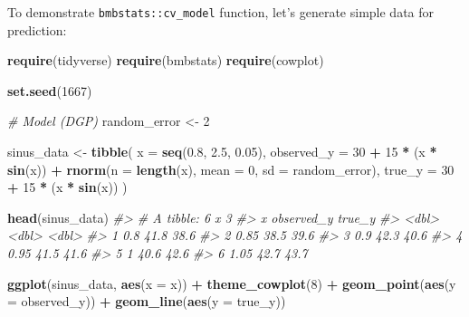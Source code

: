 \documentclass[
]{book}
\newenvironment{Shaded}{\begin{snugshade}}{\end{snugshade}}
\newcommand{\CommentTok}[1]{\textcolor[rgb]{0.56,0.35,0.01}{\textit{#1}}}
\newcommand{\DataTypeTok}[1]{\textcolor[rgb]{0.13,0.29,0.53}{#1}}
\newcommand{\DecValTok}[1]{\textcolor[rgb]{0.00,0.00,0.81}{#1}}
\newcommand{\FloatTok}[1]{\textcolor[rgb]{0.00,0.00,0.81}{#1}}
\newcommand{\KeywordTok}[1]{\textcolor[rgb]{0.13,0.29,0.53}{\textbf{#1}}}
\newcommand{\NormalTok}[1]{#1}
\newcommand{\OperatorTok}[1]{\textcolor[rgb]{0.81,0.36,0.00}{\textbf{#1}}}
\newcommand{\StringTok}[1]{\textcolor[rgb]{0.31,0.60,0.02}{#1}}
\begin{document}
To demonstrate \texttt{bmbstats::cv\_model} function, let's generate simple data for prediction:

\begin{Shaded}
\begin{Highlighting}[]
\KeywordTok{require}\NormalTok{(tidyverse)}
\KeywordTok{require}\NormalTok{(bmbstats)}
\KeywordTok{require}\NormalTok{(cowplot)}

\KeywordTok{set.seed}\NormalTok{(}\DecValTok{1667}\NormalTok{)}

\CommentTok{\# Model (DGP)}
\NormalTok{random\_error <{-}}\StringTok{ }\DecValTok{2}

\NormalTok{sinus\_data <{-}}\StringTok{ }\KeywordTok{tibble}\NormalTok{(}
  \DataTypeTok{x =} \KeywordTok{seq}\NormalTok{(}\FloatTok{0.8}\NormalTok{, }\FloatTok{2.5}\NormalTok{, }\FloatTok{0.05}\NormalTok{),}
  \DataTypeTok{observed\_y =} \DecValTok{30} \OperatorTok{+}\StringTok{ }\DecValTok{15} \OperatorTok{*}\StringTok{ }\NormalTok{(x }\OperatorTok{*}\StringTok{ }\KeywordTok{sin}\NormalTok{(x)) }\OperatorTok{+}\StringTok{ }\KeywordTok{rnorm}\NormalTok{(}\DataTypeTok{n =} \KeywordTok{length}\NormalTok{(x), }\DataTypeTok{mean =} \DecValTok{0}\NormalTok{, }\DataTypeTok{sd =}\NormalTok{ random\_error),}
  \DataTypeTok{true\_y =} \DecValTok{30} \OperatorTok{+}\StringTok{ }\DecValTok{15} \OperatorTok{*}\StringTok{ }\NormalTok{(x }\OperatorTok{*}\StringTok{ }\KeywordTok{sin}\NormalTok{(x))}
\NormalTok{)}

\KeywordTok{head}\NormalTok{(sinus\_data)}
\CommentTok{\#> \# A tibble: 6 x 3}
\CommentTok{\#>       x observed\_y true\_y}
\CommentTok{\#>   <dbl>      <dbl>  <dbl>}
\CommentTok{\#> 1  0.8        41.8   38.6}
\CommentTok{\#> 2  0.85       38.5   39.6}
\CommentTok{\#> 3  0.9        42.3   40.6}
\CommentTok{\#> 4  0.95       41.5   41.6}
\CommentTok{\#> 5  1          40.6   42.6}
\CommentTok{\#> 6  1.05       42.7   43.7}
\end{Highlighting}
\end{Shaded}

\begin{Shaded}
\begin{Highlighting}[]
\KeywordTok{ggplot}\NormalTok{(sinus\_data, }\KeywordTok{aes}\NormalTok{(}\DataTypeTok{x =}\NormalTok{ x)) }\OperatorTok{+}
\StringTok{  }\KeywordTok{theme\_cowplot}\NormalTok{(}\DecValTok{8}\NormalTok{) }\OperatorTok{+}
\StringTok{  }\KeywordTok{geom\_point}\NormalTok{(}\KeywordTok{aes}\NormalTok{(}\DataTypeTok{y =}\NormalTok{ observed\_y)) }\OperatorTok{+}
\StringTok{  }\KeywordTok{geom\_line}\NormalTok{(}\KeywordTok{aes}\NormalTok{(}\DataTypeTok{y =}\NormalTok{ true\_y))}
\end{Highlighting}
\end{Shaded}
\end{document}
